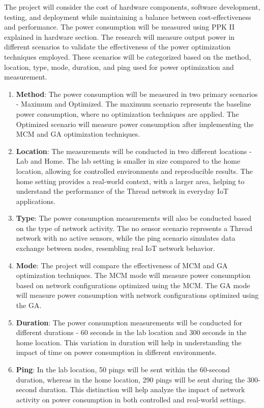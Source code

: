 The project will consider the cost of hardware components, software development, testing, and deployment while maintaining a balance between cost-effectiveness and performance. The power consumption will be measured using \gls{PPK} II explained in hardware section. The research will measure output power in different scenarios to validate the effectiveness of the power optimization techniques employed. These scenarios will be categorized based on the method, location, type, mode, duration, and ping used for power optimization and measurement.

\begin{enumerate}
  \item \textbf{Method}: The power consumption will be measured in two primary scenarios - Maximum and Optimized. The maximum scenario represents the baseline power consumption, where no optimization techniques are applied. The Optimized scenario will measure power consumption after implementing the \gls{MCM} and \gls{GA} optimization techniques.
  \item \textbf{Location}: The measurements will be conducted in two different locations - Lab and Home. The lab setting is smaller in size compared to the home location, allowing for controlled environments and reproducible results. The home setting provides a real-world context, with a larger area, helping to understand the performance of the Thread network in everyday \gls{IoT} applications.
  \item \textbf{Type}: The power consumption measurements will also be conducted based on the type of network activity. The no sensor scenario represents a Thread network with no active sensors, while the ping scenario simulates data exchange between nodes, resembling real IoT network behavior.
  \item \textbf{Mode}: The project will compare the effectiveness of \gls{MCM} and \gls{GA} optimization techniques. The \gls{MCM} mode will measure power consumption based on network configurations optimized using the \gls{MCM}. The \gls{GA} mode will measure power consumption with network configurations optimized using the \gls{GA}.
  \item \textbf{Duration}: The power consumption measurements will be conducted for different durations - 60 seconds in the lab location and 300 seconds in the home location. This variation in duration will help in understanding the impact of time on power consumption in different environments.
  \item \textbf{Ping}: In the lab location, 50 pings will be sent within the 60-second duration, whereas in the home location, 290 pings will be sent during the 300-second duration. This distinction will help analyze the impact of network activity on power consumption in both controlled and real-world settings.
\end{enumerate}

